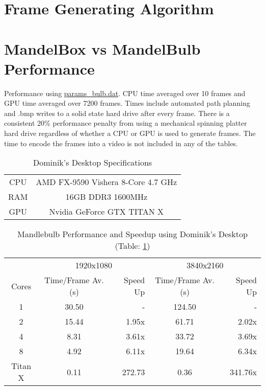 \documentclass[]{article}
\begin{document}
\section{Frame Generating Algorithm}

\section{MandelBox vs MandelBulb Performance }
Performance using \hyperref[subsec:params_bulb]{params\_bulb.dat}. CPU time averaged over 10 frames and GPU time averaged over 7200 frames. Times include automated path planning and .bmp writes to a solid state hard drive after every frame. There is a consistent 20\% performance penalty from using a mechanical spinning platter hard drive regardless of whether a CPU or GPU is used to generate frames. The time to encode the frames into a video is not included in any of the tables.

\vspace{0.125cm}

\begin{table}[h!]
\centering
\label{tab:dd_spec}
\begin{tabular}{c|c}
CPU & AMD FX-9590 Vishera 8-Core 4.7 GHz\\
RAM & 16GB DDR3 1600MHz\\
GPU & Nvidia GeForce GTX TITAN X\\
\end{tabular}
\caption{Dominik's Desktop Specifications}
\end{table}

\begin{table}[h!]
\centering
\begin{tabular}{|c|c|r|c|r|} \hline
& \multicolumn{2}{c|}{1920x1080} & \multicolumn{2}{c|}{3840x2160} \\ \cline{2-5}
Cores & Time/Frame Av. (s)  & Speed Up & Time/Frame Av. (s) & Speed Up \\ 
\hline
1 & 30.50 & - & 124.50 & -\\
2 & 15.44 & 1.95x & 61.71  & 2.02x \\
4 & 8.31  & 3.61x & 33.72  & 3.69x\\
8 & 4.92  & 6.11x & 19.64  & 6.34x\\ 
\hline
Titan X & 0.11 & 272.73 & 0.36 & 341.76x\\ \hline
\end{tabular}
\caption{Mandlebulb Performance and Speedup using Dominik's Desktop (Table: \ref{tab:dd_spec}) }
\end{table}
\end{document}

